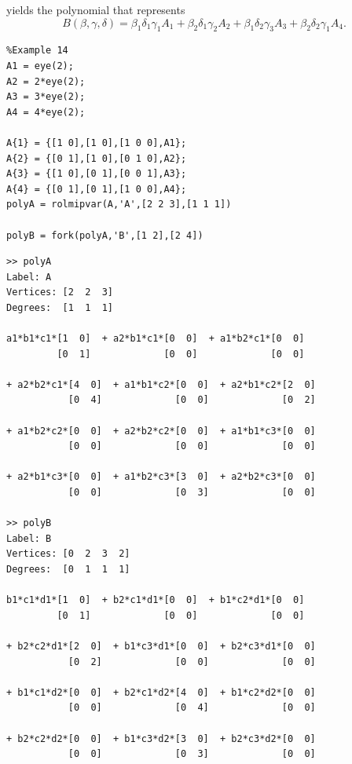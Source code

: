 \documentclass[english,11pt]{article}
\theoremstyle{break} \theorembodyfont{\small\rm}
\begin{document}
yields the polynomial 
that represents
\[
 B(\beta,\gamma,\delta) = \beta_1 \delta_1 \gamma_1 A_1 + \beta_2 \delta_1 \gamma_2 A_2  + \beta_1 \delta_2 \gamma_3 A_3 + \beta_2 \delta_2 \gamma_1 A_4.
\]

\begin{minipage}{9.5cm}
 \begin{lstlisting}
%Example 14
A1 = eye(2);
A2 = 2*eye(2);
A3 = 3*eye(2);
A4 = 4*eye(2);

A{1} = {[1 0],[1 0],[1 0 0],A1};
A{2} = {[0 1],[1 0],[0 1 0],A2};
A{3} = {[1 0],[0 1],[0 0 1],A3};
A{4} = {[0 1],[0 1],[1 0 0],A4};
polyA = rolmipvar(A,'A',[2 2 3],[1 1 1])

polyB = fork(polyA,'B',[1 2],[2 4])
 \end{lstlisting}
\end{minipage}
\vspace{0.2cm}

\begin{minipage}{15.5cm}
\begin{lstlisting}[rulecolor=\color{red}]
>> polyA
Label: A
Vertices: [2  2  3]
Degrees:  [1  1  1]

a1*b1*c1*[1  0]  + a2*b1*c1*[0  0]  + a1*b2*c1*[0  0]
         [0  1]             [0  0]             [0  0]

+ a2*b2*c1*[4  0]  + a1*b1*c2*[0  0]  + a2*b1*c2*[2  0]
           [0  4]             [0  0]             [0  2]

+ a1*b2*c2*[0  0]  + a2*b2*c2*[0  0]  + a1*b1*c3*[0  0]
           [0  0]             [0  0]             [0  0]

+ a2*b1*c3*[0  0]  + a1*b2*c3*[3  0]  + a2*b2*c3*[0  0]
           [0  0]             [0  3]             [0  0]

>> polyB
Label: B
Vertices: [0  2  3  2]
Degrees:  [0  1  1  1]

b1*c1*d1*[1  0]  + b2*c1*d1*[0  0]  + b1*c2*d1*[0  0]
         [0  1]             [0  0]             [0  0]

+ b2*c2*d1*[2  0]  + b1*c3*d1*[0  0]  + b2*c3*d1*[0  0]
           [0  2]             [0  0]             [0  0]

+ b1*c1*d2*[0  0]  + b2*c1*d2*[4  0]  + b1*c2*d2*[0  0]
           [0  0]             [0  4]             [0  0]

+ b2*c2*d2*[0  0]  + b1*c3*d2*[3  0]  + b2*c3*d2*[0  0]
           [0  0]             [0  3]             [0  0]
\end{lstlisting}
\end{minipage}
\vspace{0.2cm}
\end{document}
